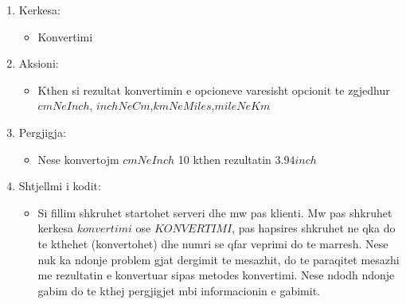 \documentclass[]{article}
\begin{document}
\begin{enumerate}
\item Kerkesa:
\begin{itemize}
\item Konvertimi
\end{itemize}
\item Aksioni:
\begin{itemize}
\item Kthen si rezultat konvertimin e opcioneve varesisht opcionit te zgjedhur $cmNeInch$, $inchNeCm$,$kmNeMiles$,$mileNeKm$ 
\end{itemize}
\item Pergjigja:
\begin{itemize}
\item Nese konvertojm $cmNeInch$ 10 kthen rezultatin $3.94 inch$
\end{itemize}
\item Shtjellmi i kodit:
\begin{itemize}
\item Si fillim shkruhet startohet serveri dhe mw pas klienti. Mw pas
shkruhet kerkesa $konvertimi$ ose $KONVERTIMI$, pas hapsires
shkruhet ne qka do te kthehet (konvertohet) dhe numri se
qfar veprimi do te marresh. Nese nuk ka ndonje problem gjat
dergimit te mesazhit, do te  paraqitet mesazhi me
rezultatin e konvertuar sipas metodes konvertimi. Nese
ndodh ndonje gabim do te kthej pergjigjet mbi informacionin e gabimit.
\end{itemize}
\end{enumerate}
\newpage
\end{document}

